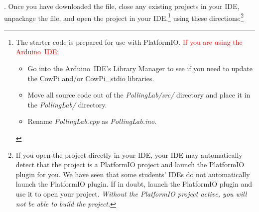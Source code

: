 \filesource.
Once you have downloaded the file, close any existing projects in your IDE, unpackage the file, and open the project in your IDE.\footnote{
    The starter code is prepared for use with PlatformIO.   %
    \textcolor{red}{If you are using the Arduino~IDE:}
    \begin{itemize}
        \item Go into the Arduino~IDE's Library Manager to see if you need to update the CowPi and/or CowPi\_stdio libraries.
        \item Move all source code out of the \textit{PollingLab/src/} directory and place it in the \textit{PollingLab/} directory.
        \item Rename \textit{PollingLab.cpp} as \textit{PollingLab.ino}.
    \end{itemize}
}
using these directions:\footnote{
    If you open the project directly in your IDE, your IDE may automatically detect that the project is a PlatformIO project and launch the PlatformIO plugin for you.
    We have seen that some students' IDEs do not automatically launch the PlatformIO plugin.
    If in doubt, launch the PlatformIO plugin and use it to open your project.
    \textit{Without the PlatformIO project active, you will not be able to build the project.}
}

\begin{description}
\end{description}


